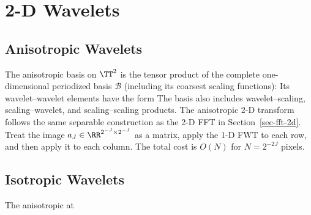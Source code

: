                                                    
\section{2-D Wavelets}

                                                   
\subsection{Anisotropic Wavelets}

The anisotropic basis on $\TT^2$ is the tensor product of the complete one-dimensional periodized basis $\mathcal B$ (including its coarsest scaling functions):
Its wavelet--wavelet elements have the form
The basis also includes wavelet--scaling, scaling--wavelet, and scaling--scaling products.
The anisotropic 2-D transform follows the same separable construction as the 2-D FFT in Section~\ref{sec-fft-2d}. Treat the image $a_J \in \RR^{2^{-J} \times 2^{-J}}$ as a matrix, apply the 1-D FWT to each row, and then apply it to each column. The total cost is $O(N)$ for $N=2^{-2J}$ pixels.


                                                   
\subsection{Isotropic Wavelets}\label{sec-isotropic-wav}

The anisotropic at